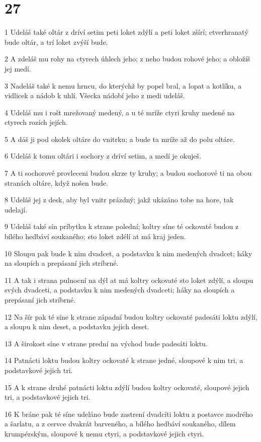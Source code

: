 \chapter{27}

\par 1 Udeláš také oltár z dríví setim peti loket zdýlí a peti loket zšírí; ctverhranatý bude oltár, a trí loket zvýší bude.
\par 2 A zdeláš mu rohy na ctyrech úhlech jeho; z neho budou rohové jeho; a obložíš jej medí.
\par 3 Nadeláš také k nemu hrncu, do kterýchž by popel bral, a lopat a kotlíku, a vidlicek a nádob k uhlí. Všecka nádobí jeho z medi udeláš.
\par 4 Udeláš mu i rošt mrežovaný medený, a u té mríže ctyri kruhy medené na ctyrech rozích jejích.
\par 5 A dáš ji pod okolek oltáre do vnitrku; a bude ta mríže až do polu oltáre.
\par 6 Udeláš k tomu oltári i sochory z dríví setim, a medí je okuješ.
\par 7 A ti sochorové provleceni budou skrze ty kruhy; a budou sochorové ti na obou stranách oltáre, když nošen bude.
\par 8 Udeláš jej z desk, aby byl vnitr prázdný; jakž ukázáno tobe na hore, tak udelají.
\par 9 Udeláš také sín príbytku k strane polední; koltry síne té ockovaté budou z bílého hedbáví soukaného; sto loket zdélí at má kraj jeden.
\par 10 Sloupu pak bude k nim dvadcet, a podstavku k nim medených dvadcet; háky na sloupích a prepásaní jich stríbrné.
\par 11 A tak i strana pulnocní na dýl at má koltry ockovaté sto loket zdýlí, a sloupu svých dvadceti, a podstavku k nim medených dvadceti; háky na sloupích a prepásaní jich stríbrné.
\par 12 Na šír pak té síne k strane západní budou koltry ockovaté padesáti loktu zdýlí, a sloupu k nim deset, a podstavku jejich deset.
\par 13 A širokost síne v strane prední na východ bude padesáti loktu.
\par 14 Patnácti loktu budou koltry ockovaté k strane jedné, sloupové k nim tri, a podstavkové jejich tri.
\par 15 A k strane druhé patnácti loktu zdýlí budou koltry ockovaté, sloupové jejich tri, a podstavkové jejich tri.
\par 16 K bráne pak té síne udeláno bude zastrení dvadcíti loktu z postavce modrého a šarlatu, a z cervce dvakrát barveného, a bílého hedbáví soukaného, dílem krumpérským, sloupové k nemu ctyri, a podstavkové jejich ctyri.
